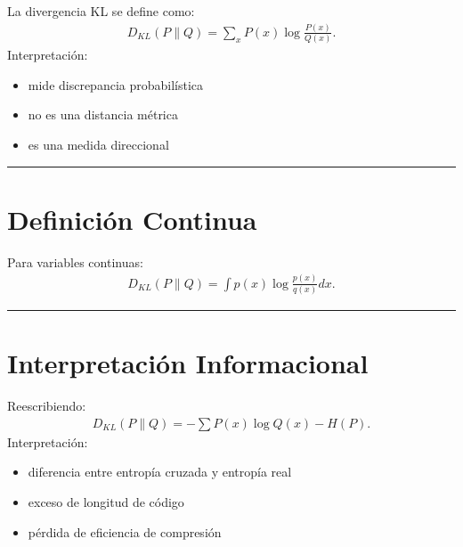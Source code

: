 \documentclass[letterpaper,10pt,english]{jupyterBook}
\begin{document}
\sphinxAtStartPar
La divergencia KL se define como:
\begin{equation*}
\begin{split}
D_{KL}(P\|Q)=
\sum_x P(x)\log\frac{P(x)}{Q(x)}.
\end{split}
\end{equation*}
\sphinxAtStartPar
Interpretación:
\begin{itemize}
\item {} 
\sphinxAtStartPar
mide discrepancia probabilística

\item {} 
\sphinxAtStartPar
no es una distancia métrica

\item {} 
\sphinxAtStartPar
es una medida direccional

\end{itemize}


\bigskip\hrule\bigskip



\section{Definición Continua}
\label{\detokenize{02_mathematical_foundations/kl_divergence:definicion-continua}}
\sphinxAtStartPar
Para variables continuas:
\begin{equation*}
\begin{split}
D_{KL}(P\|Q)=
\int p(x)\log\frac{p(x)}{q(x)}dx.
\end{split}
\end{equation*}

\bigskip\hrule\bigskip



\section{Interpretación Informacional}
\label{\detokenize{02_mathematical_foundations/kl_divergence:interpretacion-informacional}}
\sphinxAtStartPar
Reescribiendo:
\begin{equation*}
\begin{split}
D_{KL}(P\|Q)
=
-\sum P(x)\log Q(x)
-
H(P).
\end{split}
\end{equation*}
\sphinxAtStartPar
Interpretación:
\begin{itemize}
\item {} 
\sphinxAtStartPar
diferencia entre entropía cruzada y entropía real

\item {} 
\sphinxAtStartPar
exceso de longitud de código

\item {} 
\sphinxAtStartPar
pérdida de eficiencia de compresión

\end{itemize}
\end{document}
